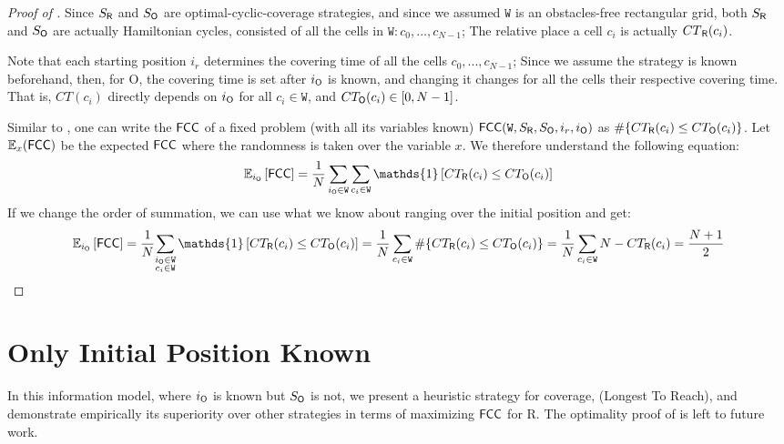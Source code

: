 \documentclass[a4paper,11pt]{article}
\theoremstyle{definition}
\newcommand{\rob}{{{\sf R}}\xspace}
\newcommand{\opp}{{{\sf O}}\xspace}
\newcommand{\w}{{{\texttt W}}\xspace}
\newcommand{\fcc}{{{\sf{FCC}}}\xspace}
\newcommand{\ltr}{{{\sf{LTR}}}\xspace}
\begin{document}
\begin{proof}[Proof of ]
Since $S_{\rob}$ and $S_{\opp}$ are optimal-cyclic-coverage strategies, and since we assumed $\w$ is an obstacles-free rectangular grid, both $S_{\rob}$ and $S_\opp$ are actually Hamiltonian cycles, consisted of all the cells in $\w:c_0,...,c_{N-1}$; The relative place a cell $c_i$ is actually  ${CT}_{\rob}(c_i)$. 

Note that each starting position $i_r$ determines the covering time of all the cells $c_0,...,c_{N-1}$; Since we assume the strategy is known beforehand, then, for \opp, the covering time is set after $i_\opp$ is known, and changing it changes for all the cells their respective covering time. That is, $CT\left(c_i\right)$ directly depends on $i_\opp$ for all $c_i\in\w$, and $CT_{\opp}(c_i)\in [0,N-1]$.

Similar to , one can write the $\fcc$ of a fixed problem (with all its variables known) $\fcc(\w,S_{\rob},S_{\opp},i_r,i_\opp)$ as $\# \lbrace CT_{\rob}(c_i) \le CT_{\opp}(c_i)\rbrace$. Let $\mathbb{E}_{x}(\fcc)$ be the expected $\fcc$ where the randomness is taken over the variable $x$. We therefore understand the following equation:
\[\mathbb{E}_{i_\opp}\left[\fcc\right]=
\frac{1}{N}\sum_{i_\opp\in \w}{\sum_{c_i\in \w}{\mathds{1}\left[CT_{\rob}(c_i) \le CT_{\opp}(c_i)\right]}}\]
If we change the order of summation, we can use what we know about ranging over the initial position and get:
\begin{dmath*}[compact]
\mathbb{E}_{i_\opp}\left[\fcc\right]=
\frac{1}{N}{\sum_{\substack{i_\opp\in \w \\c_i\in \w}}{\mathds{1}\left[CT_{\rob}(c_i) \le CT_{\opp}(c_i)\right]}}=
\frac{1}{N}\sum_{c_i\in \w}{\# \lbrace CT_{\rob}(c_i) \le CT_{\opp}(c_i)\rbrace}=
\frac{1}{N}\sum_{c_i\in \w}{N-CT_{\rob}(c_i)}=
\frac{N+1}{2}
\end{dmath*}
\end{proof}

\section{Only Initial Position Known}
In this information model, where $i_{\opp}$ is known but $S_{\opp}$ is not, we present a heuristic strategy for coverage, \ltr (Longest To Reach), and demonstrate empirically its superiority over other strategies in terms of maximizing $\fcc$ for \rob. 
The optimality proof of \ltr is left to future work.
\end{document}
